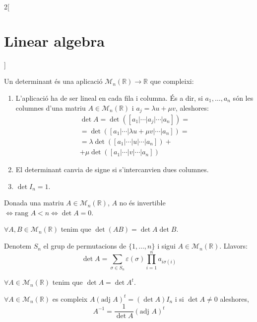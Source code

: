 \documentclass[class=article,10pt,crop=false]{standalone}
\begin{document}
\begin{multicols}{2}[\section{Linear algebra}]
\begin{theorem}
\end{theorem}
\begin{definition}
Un determinant és una aplicació $\mathcal{M}_n(\mathbb{R})\rightarrow\mathbb{R}$ que compleixi:
\begin{enumerate}
    \item L'aplicació ha de ser lineal en cada fila i columna. És a dir, si $a_1,\ldots,a_n$ són les columnes d'una matriu $A\in\mathcal{M}_n(\mathbb{R})$ i $a_j=\lambda u+\mu v$, aleshores:
    \begin{multline*}
        \det A=\det([a_1|\cdots|a_j|\cdots| a_n])=\\=\det([a_1|\cdots|\lambda u+\mu v|\cdots| a_n])=\\=\lambda\det([a_1|\cdots| u|\cdots| a_n])+\\+\mu\det([a_1|\cdots| v|\cdots| a_n])
    \end{multline*}
    \item El determinant canvia de signe si s'intercanvien dues columnes.
    \item $\det I_n=1$.
\end{enumerate}
\end{definition}
\begin{prop}
Donada una matriu $A\in\mathcal{M}_n(\mathbb{R})$, $A$ no és invertible $\iff\text{rang }A<n\iff\det A=0$.
\end{prop}
\begin{theorem}
$\forall A,B\in\mathcal{M}_n(\mathbb{R})$ tenim que $\det (AB)=\det A\det B$.
\end{theorem}
\begin{prop}
Denotem $S_n$ el grup de permutacions de $\{1,\ldots,n\}$ i sigui $A\in\mathcal{M}_n(\mathbb{R})$. Llavors: $$\det A=\sum_{\sigma\in S_n}\varepsilon(\sigma)\prod_{i=1}^na_{i\sigma(i)}$$
\end{prop}
\begin{prop}
$\forall A\in\mathcal{M}_n(\mathbb{R})$ tenim que $\det A=\det A^t$.
\end{prop}
\begin{theorem}
$\forall A\in\mathcal{M}_n(\mathbb{R})$ es compleix $A(\text{adj }A)^t=(\det A)I_n$ i si $\det A\ne 0$ aleshores, $$A^{-1}=\frac{1}{\det A}(\text{adj }A)^t$$
\end{theorem}

\end{multicols}
\end{document}
